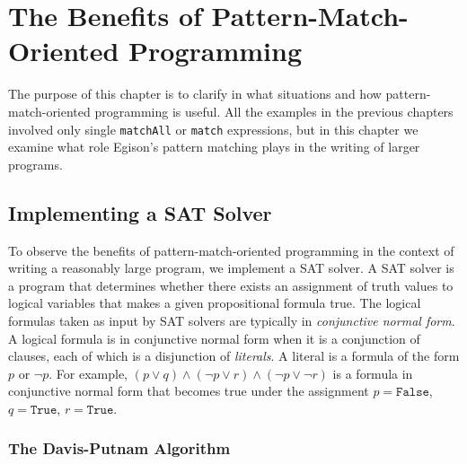 \chapter{The Benefits of Pattern-Match-Oriented Programming}\label{essence}

The purpose of this chapter is to clarify in what situations and how pattern-match-oriented programming is useful.
All the examples in the previous chapters involved only single \lstinline{matchAll} or \lstinline{match} expressions, but in this chapter we examine what role Egison's pattern matching plays in the writing of larger programs.

\section{Implementing a SAT Solver}\label{essence-sat}

To observe the benefits of pattern-match-oriented programming in the context of writing a reasonably large program, we implement a SAT solver.
A SAT solver is a program that determines whether there exists an assignment of truth values to logical variables that makes a given propositional formula true.
The logical formulas taken as input by SAT solvers are typically in \emph{conjunctive normal form}.
A logical formula is in conjunctive normal form when it is a conjunction of clauses, each of which is a disjunction of \emph{literals}.
A literal is a formula of the form $p$ or $\neg p$.
For example, $(p \lor q) \wedge (\neg p \lor r) \wedge (\neg p \lor \neg r)$ is a formula in conjunctive normal form that becomes true under the assignment $p = \texttt{False}$, $q = \texttt{True}$, $r = \texttt{True}$.

\subsection{The Davis-Putnam Algorithm}

